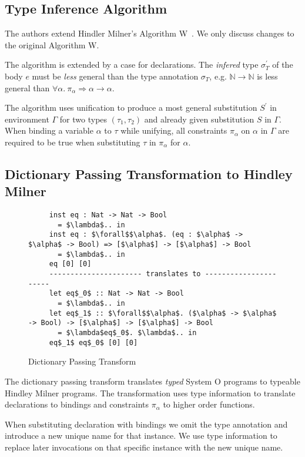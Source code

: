 \documentclass[runningheads]{llncs}
\newcommand{\snip}[1]{\footnotesize{\ttfamily{#1}}}
\begin{document}
\subsection{Type Inference Algorithm}
The authors extend Hindler Milner's Algorithm W~\cite{hm78}. We only discuss changes to the original Algorithm W.

The algorithm is extended by a case for \snip{inst} declarations. The \emph{infered} type $\sigma_T^\prime$ of the body $e$ must be \emph{less} general than the type annotation $\sigma_T$, e.g. $\mathbb{N} \rightarrow \mathbb{N}$ is less general than $\forall \alpha. \ \pi_\alpha \Rightarrow \alpha \rightarrow \alpha$.

The algorithm uses unification to produce a most general substitution $S^\prime$ in environment $\Gamma$ for two types $(\tau_1, \tau_2)$ and already given substitution $S$ in $\Gamma$. When binding a variable $\alpha$ to $\tau$ while unifying, all constraints $\pi_\alpha$ on $\alpha$ in $\Gamma$ are required to be true when substituting $\tau$ in $\pi_\alpha$ for $\alpha$.
\subsection{Dictionary Passing Transformation to Hindley Milner}
\begin{figure}
  \begin{lstlisting}
     inst eq : Nat -> Nat -> Bool 
       = $\lambda$.. in                 
     inst eq : $\forall$$\alpha$. (eq : $\alpha$ -> $\alpha$ -> Bool) => [$\alpha$] -> [$\alpha$] -> Bool 
       = $\lambda$.. in
     eq [0] [0]
     ---------------------- translates to ----------------------
     let eq$_0$ :: Nat -> Nat -> Bool
       = $\lambda$.. in
     let eq$_1$ :: $\forall$$\alpha$. ($\alpha$ -> $\alpha$ -> Bool) -> [$\alpha$] -> [$\alpha$] -> Bool     
       = $\lambda$eq$_0$. $\lambda$.. in
     eq$_1$ eq$_0$ [0] [0]  
  \end{lstlisting}
  \caption{Dictionary Passing Transform} \label{transform}
\end{figure}
The dictionary passing transform translates \emph{typed} System O programs to typeable Hindley Milner programs. The transformation uses type information to translate \snip{inst} declarations to \snip{let} bindings and constraints $\pi_\alpha$ to higher order functions. 

When substituting \snip{inst} declaration with \snip{let} bindings we omit the type annotation and introduce a new unique name for that instance. We  use type information to replace later invocations on that specific instance with the new unique name. 
\end{document}
